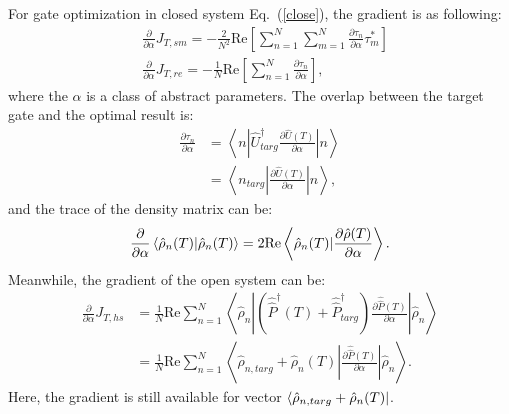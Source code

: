 For gate optimization in closed system Eq.~(\ref{close}), the gradient is as following:
\begin{equation}
    \begin{split}
        &\frac{\partial}{\partial \alpha}J_{T,sm}=-\frac{2}{N^{2}}\mathrm{Re}\left[\sum_{n=1}^{N}\sum_{m=1}^{N}\frac{\partial \tau_{n}}{\partial \alpha}\tau^{*}_{m}\right]\\
        &\frac{\partial}{\partial \alpha}J_{T,re}=-\frac{1}{N}\mathrm{Re}\left[\sum_{n=1}^{N}\frac{\partial \tau_{n}}{\partial \alpha}\right],
    \end{split}
\end{equation}
where the $\alpha$ is a class of abstract parameters. The overlap between the target gate and the optimal result is:
\begin{equation}
    \begin{split}
        \frac{\partial \tau_{n}}{\partial \alpha}&=\left<n\left|\hat{U}^{\dagger}_{targ}\frac{\partial\hat{U}(T)}{\partial \alpha}\right|n\right>\\
        &=\left<n_{targ}\left|\frac{\partial \hat{U}(T)}{\partial \alpha}\right|n\right>,
    \end{split}
\end{equation}
and the trace of the density matrix can be:
\begin{equation}
    \begin{split}
        \frac{\partial}{\partial \alpha}\braket{\hat{\rho}_{n}(T)|\hat{\rho}_{n}(T)}=2\mathrm{Re}\left<\hat{\rho}_{n}(T)|\frac{\partial \hat{\rho}(T)}{\partial \alpha}\right>.
    \end{split}
    \label{overlap}
\end{equation}
Meanwhile, the gradient of the open system can be:
\begin{equation}
    \begin{split}
        \frac{\partial}{\partial \alpha}J_{T,hs}&=\frac{1}{N}\mathrm{Re}\sum_{n=1}^{N}\left<\hat{\rho}_{n}\left|\left(\hat{\hat{P}}^{\dagger}(T)+\hat{\hat{P}}^{\dagger}_{targ}\right)\frac{\partial \hat{\hat{P}}(T)}{\partial \alpha}\right|\hat{\rho}_{n}\right>\\
        &=\frac{1}{N}\mathrm{Re}\sum_{n=1}^{N}\left<\hat{\rho}_{n,targ}+\hat{\rho}_{n}(T)\left|\frac{\partial\hat{\hat{P}}(T)}{\partial \alpha}\right|\hat{\rho}_{n}\right>.
    \end{split}
\end{equation}
Here, the gradient is still available for vector $\bra{\hat{\rho}_{n,targ}+\hat{\rho}_{n}(T)}$.

